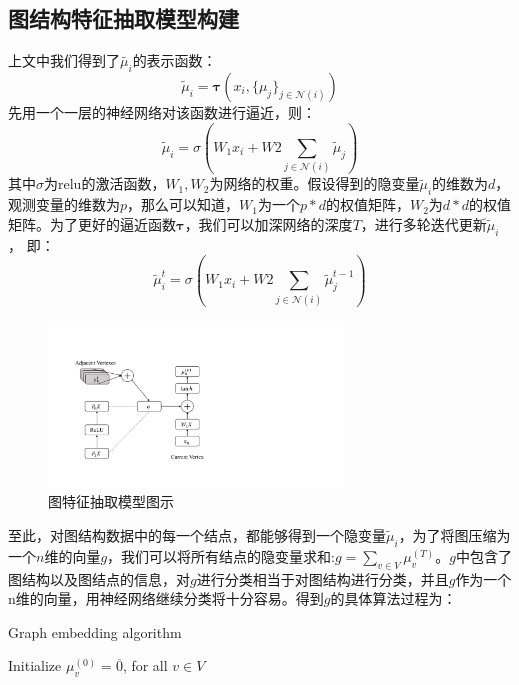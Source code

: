 \subsection{图结构特征抽取模型构建}
上文中我们得到了$\tilde{\mu_i}$的表示函数：
\begin{equation}
\tilde{\mu}_i = \boldsymbol{\tau} (x_i, \{\mu_j\}_{j\in \mathcal{N}(i)})
\end{equation}
先用一个一层的神经网络对该函数进行逼近，则：
\begin{equation}
\tilde{\mu}_i = \sigma(W_1x_i + W2\sum_{j\in \mathcal{N}(i)}\tilde{\mu}_j)
\end{equation}
其中$\sigma$为relu的激活函数，$W_1, W_2$为网络的权重。假设得到的隐变量$\tilde{\mu}_i$的维数为$d$，观测变量的维数为$p$，那么可以知道，$W_1$为一个$p*d$的权值矩阵，$W_2$为$d*d$的权值矩阵。为了更好的逼近函数$\boldsymbol{\tau}$，我们可以加深网络的深度$T$，进行多轮迭代更新$\tilde{\mu}_i$， 即：
\begin{equation}
\tilde{\mu}_i^t = \sigma(W_1x_i + W2\sum_{j\in \mathcal{N}(i)}\tilde{\mu}_j^{t-1})
\end{equation}
\begin{figure}[htbp]
	\begin{center}
		\includegraphics[width=0.7\textwidth]{figures//5.pdf}
		\caption{图特征抽取模型图示}
		\label{default}
	\end{center}
\end{figure}
至此，对图结构数据中的每一个结点，都能够得到一个隐变量$\tilde{\mu}_i$，为了将图压缩为一个$n$维的向量$g$，我们可以将所有结点的隐变量求和:$g =\sum_{v\in V} \mu_v^{(T)}$。$g$中包含了图结构以及图结点的信息，对$g$进行分类相当于对图结构进行分类，并且$g$作为一个n维的向量，用神经网络继续分类将十分容易。得到$g$的具体算法过程为：
\begin{algorithm}  
	\caption{Graph embedding algorithm}  
	Initialize $\mu_v^{(0)} = \overline{0}$, for all $v \in V$\\
\end{algorithm}  
